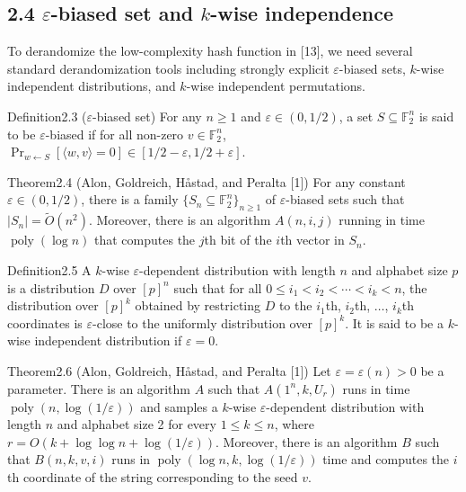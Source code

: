 \subsection*{2.4 $\varepsilon$-biased set and $k$-wise independence}
To derandomize the low-complexity hash function in [13], we need several standard derandomization tools including strongly explicit $\varepsilon$-biased sets, $k$-wise independent distributions, and $k$-wise independent permutations.
\begin{authorclaim}{Definition2.3 ($\varepsilon$-biased set)}
For any $n\ge1$ and $\varepsilon\in(0,1/2)$, a set $S\subseteq\mathbb F_2^n$ is said to be $\varepsilon$-biased if for all non-zero $v\in\mathbb F_2^n$, $\Pr_{w\leftarrow S}[\langle w,v\rangle=0]\in[1/2-\varepsilon,1/2+\varepsilon]$.
\end{authorclaim}
\begin{authorclaim}{Theorem2.4 (Alon, Goldreich, H\aa stad, and Peralta [1])}
For any constant $\varepsilon\in(0,1/2)$, there is a family $\{S_n\subseteq\mathbb F_2^n\}_{n\ge1}$ of $\varepsilon$-biased sets such that $|S_n|=\widetilde O(n^2)$. Moreover, there is an algorithm $A(n,i,j)$ running in time $\operatorname{poly}(\log n)$ that computes the $j$th bit of the $i$th vector in $S_n$.
\end{authorclaim}
\begin{authorclaim}{Definition2.5}
A $k$-wise $\varepsilon$-dependent distribution with length $n$ and alphabet size $p$ is a distribution $D$ over $[p]^n$ such that for all $0\le i_1<i_2<\cdots<i_k<n$, the distribution over $[p]^k$ obtained by restricting $D$ to the $i_1$th, $i_2$th, $\ldots$, $i_k$th coordinates is $\varepsilon$-close to the uniformly distribution over $[p]^k$. It is said to be a $k$-wise independent distribution if $\varepsilon=0$.
\end{authorclaim}
\begin{authorclaim}{Theorem2.6 (Alon, Goldreich, H\aa stad, and Peralta [1])}
Let $\varepsilon=\varepsilon(n)>0$ be a parameter. There is an algorithm $A$ such that $A(1^n,k,U_r)$ runs in time $\operatorname{poly}(n,\log(1/\varepsilon))$ and samples a $k$-wise $\varepsilon$-dependent distribution with length $n$ and alphabet size 2 for every $1\le k\le n$, where $r=O(k+\log\log n+\log(1/\varepsilon))$. Moreover, there is an algorithm $B$ such that $B(n,k,v,i)$ runs in $\operatorname{poly}(\log n,k,\log(1/\varepsilon))$ time and computes the $i$th coordinate of the string corresponding to the seed $v$.
\end{authorclaim}
